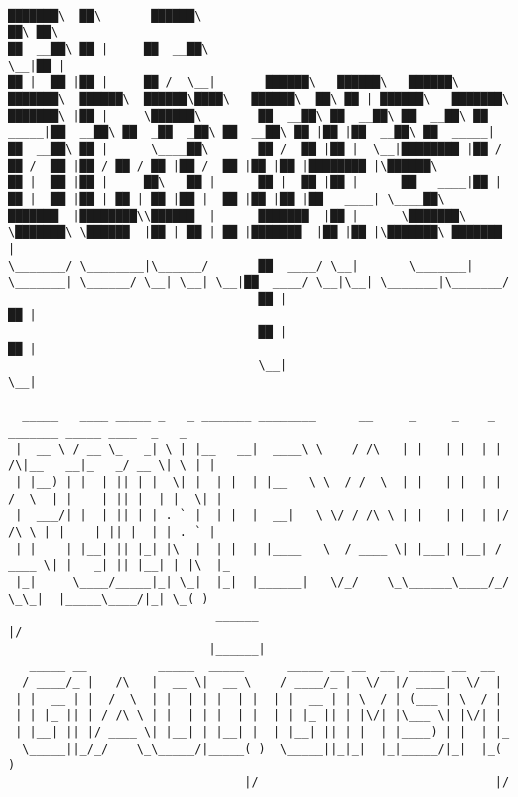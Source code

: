 \documentclass[varwidth=\maxdimen,margin=0.5cm,multi={verbatim}]{standalone}
\begin{document}
\begin{verbatim}

███████\  ██\       ██████\                                                                                  ██\ ██\
██  __██\ ██ |     ██  __██\                                                                                 \__|██ |
██ |  ██ |██ |     ██ /  \__|       ██████\   ██████\   ██████\   ███████\  ██████\  ██████\████\   ██████\  ██\ ██ | ██████\   ███████\
███████\ |██ |     \██████\        ██  __██\ ██  __██\ ██  __██\ ██  _____|██  __██\ ██  _██  _██\ ██  __██\ ██ |██ |██  __██\ ██  _____|
██  __██\ ██ |      \____██\       ██ /  ██ |██ |  \__|████████ |██ /      ██ /  ██ |██ / ██ / ██ |██ /  ██ |██ |██ |████████ |\██████\
██ |  ██ |██ |     ██\   ██ |      ██ |  ██ |██ |      ██   ____|██ |      ██ |  ██ |██ | ██ | ██ |██ |  ██ |██ |██ |██   ____| \____██\
███████  |████████\\██████  |      ███████  |██ |      \███████\ \███████\ \██████  |██ | ██ | ██ |███████  |██ |██ |\███████\ ███████  |
\_______/ \________|\______/       ██  ____/ \__|       \_______| \_______| \______/ \__| \__| \__|██  ____/ \__|\__| \_______|\_______/
                                   ██ |                                                            ██ |
                                   ██ |                                                            ██ |
                                   \__|                                                            \__|

  _____   ____ _____ _   _ _______ ________      __     _     _    _      _______ _____ ____  _   _
 |  __ \ / __ \_   _| \ | |__   __|  ____\ \    / /\   | |   | |  | |  /\|__   __|_   _/ __ \| \ | |
 | |__) | |  | || | |  \| |  | |  | |__   \ \  / /  \  | |   | |  | | /  \  | |    | || |  | |  \| |
 |  ___/| |  | || | | . ` |  | |  |  __|   \ \/ / /\ \ | |   | |  | |/ /\ \ | |    | || |  | | . ` |
 | |    | |__| || |_| |\  |  | |  | |____   \  / ____ \| |___| |__| / ____ \| |   _| || |__| | |\  |_
 |_|     \____/_____|_| \_|  |_|  |______|   \/_/    \_\______\____/_/    \_\_|  |_____\____/|_| \_( )
                             ______                                                                |/
                            |______|
   _____ __          _____  _____      _____ __ __  __  _____ __  __
  / ____/_ |   /\   |  __ \|  __ \    / ____/_ |  \/  |/ ____|  \/  |
 | |  __ | |  /  \  | |  | | |  | |  | |  __ | | \  / | (___ | \  / |
 | | |_ || | / /\ \ | |  | | |  | |  | | |_ || | |\/| |\___ \| |\/| |
 | |__| || |/ ____ \| |__| | |__| |  | |__| || | |  | |____) | |  | |_
  \_____||_/_/    \_\_____/|_____( )  \_____||_|_|  |_|_____/|_|  |_( )
                                 |/                                 |/


\end{verbatim}
\end{document}
